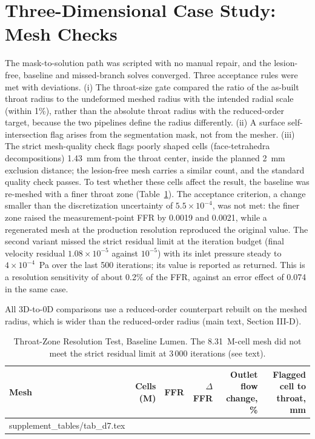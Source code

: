 \documentclass[journal,twoside,web,onecolumn]{ieeecolor}
\begin{document}
\FloatBarrier
\section{Three-Dimensional Case Study: Mesh Checks}\label{sec:cfd}
The mask-to-solution path was scripted with no manual repair, and the lesion-free, baseline and missed-branch solves
converged. Three acceptance rules were met with deviations. (i) The throat-size gate compared the ratio of the
as-built throat radius to the undeformed meshed radius with the intended radial scale (within 1\%), rather than the
absolute throat radius with the reduced-order target, because the two pipelines define the radius differently. (ii) A surface self-intersection flag arises from the segmentation mask, not from the mesher. (iii) The
strict mesh-quality check flags poorly shaped cells (face-tetrahedra decompositions) 1.43~mm from the throat center,
inside the planned 2~mm exclusion distance; the lesion-free mesh carries a similar count, and the standard quality
check passes. To test whether these cells affect the result, the baseline was re-meshed with a finer throat zone
(Table~\ref{tab:d7}). The acceptance criterion, a change smaller than the discretization uncertainty of
$5.5\times10^{-4}$, was not met: the finer zone raised the measurement-point FFR by 0.0019 and 0.0021, while a
regenerated mesh at the production resolution reproduced the original value. The second variant missed the strict
residual limit at the iteration budget (final velocity residual $1.08\times10^{-5}$ against $10^{-5}$) with its inlet
pressure steady to $4\times10^{-4}$~Pa over the last 500 iterations; its value is reported as returned. This is a resolution sensitivity of
about 0.2\% of the FFR, against an error effect of 0.074 in the same case.

All 3D-to-0D comparisons use a reduced-order counterpart rebuilt on the meshed radius, which is wider than the
reduced-order radius (main text, Section III-D).
\begin{table}[!ht]
\caption{Throat-Zone Resolution Test, Baseline Lumen. The 8.31~M-cell mesh did not meet the strict residual limit at
3\,000 iterations (see text).}\label{tab:d7}
\centering\small
\begin{tabular}{@{}lrrrrr@{}}
\toprule
Mesh & Cells (M) & FFR & $\Delta$FFR & Outlet flow change, \% & Flagged cell to throat, mm\\
\midrule
{} supplement_tables/tab_d7.tex 
\bottomrule
\end{tabular}
\end{table}
\end{document}
